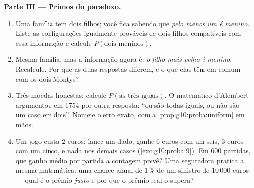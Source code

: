 \begin{problem}
\medskip
\noindent\textbf{Parte III --- Primos do paradoxo.}
\begin{enumerate}[resume]
  \item Uma família tem dois filhos; você fica sabendo que
        \emph{pelo menos um é menino}. Liste as configurações
        igualmente prováveis de dois filhos compatíveis com essa
        informação e calcule $P(\text{dois meninos})$.
  \item Mesma família, mas a informação agora é: \emph{o filho
        mais velho é menino}. Recalcule. Por que as duas
        respostas diferem, e o que elas têm em comum com os dois
        Montys?
  \item Três moedas honestas: calcule $P(\text{as três iguais})$.
        O matemático d'Alembert argumentou em 1754 por outra
        resposta: ``ou são todas iguais, ou não são --- um caso
        em dois''. Nomeie o erro exato, com a
        \cref{prop:g10:proba:uniform} em mãos.
  \item Um jogo custa $2$ euros: lance um dado, ganhe $6$ euros
        com um seis, $3$ euros com um cinco, e nada nos demais
        casos (\cref{exo:g10:proba:9}). Em $600$ partidas, que
        ganho médio por partida a contagem prevê? Uma seguradora
        pratica a mesma matemática: uma chance anual de $1\,\%$
        de um sinistro de $10\,000$ euros --- qual é o prêmio
        \emph{justo} e por que o prêmio real o supera?
\end{enumerate}


\end{problem}
